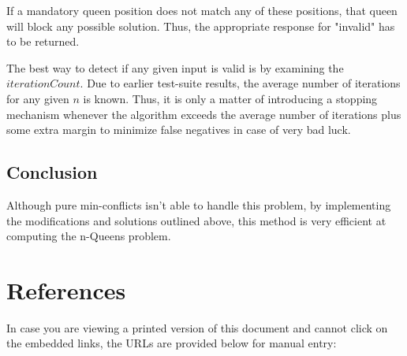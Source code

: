 \documentclass{article}
\begin{document}
If a mandatory queen position does not match any of these positions, that queen will block any possible solution.
Thus, the appropriate response for "invalid" has to be returned.

The best way to detect if any given input is valid is by examining the \(iterationCount\).
Due to earlier test-suite results, the average number of iterations for any given \(n\) is known.
Thus, it is only a matter of introducing a stopping mechanism whenever the algorithm exceeds the average number of iterations
plus some extra margin to minimize false negatives in case of very bad luck.

\subsection{Conclusion}
Although pure min-conflicts isn't able to handle this problem, by implementing the modifications and solutions outlined above,
this method is very efficient at computing the n-Queens problem.

\clearpage

\section*{References}
In case you are viewing a printed version of this document and cannot click on the embedded links, the URLs are provided below for manual entry:

\sloppy
\end{document}
